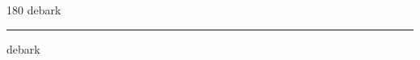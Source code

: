 
\begin{frame}
\begin{center}
\begin{turn}{180}
{\fontsize{2.5cm}{1em}\selectfont debark}
\end{turn}
\vspace{1em}\par  
\hrule
\vspace{1em}\par  
{\fontsize{2.5cm}{1em}\selectfont debark}
\end{center}
\end{frame}
